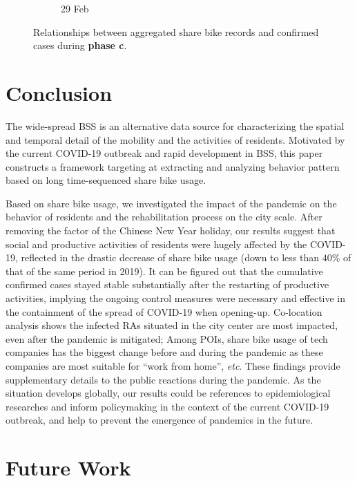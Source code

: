 \documentclass[ijgi,submit,moreauthors,pdftex]{Definitions/mdpi}
\begin{document}
\begin{figure}[!ht]
\begin{subfigure}{.3\textwidth}
\begin{tikzpicture}[inner sep = 0pt]
        \end{tikzpicture}
        \caption{29 Feb}
        \label{fig:correlation_02_29}
    \end{subfigure}
    \caption{Relationships between aggregated share bike records and confirmed cases during \textbf{phase c}.}
    \label{fig:BSS_phase_3}
\end{figure}


\section{Conclusion}\label{sec:conclusion}
The wide-spread BSS is an alternative data source for characterizing the spatial and temporal detail of the mobility and the activities of residents.
Motivated by the current COVID-19 outbreak and rapid development in BSS, this paper constructs a framework targeting at extracting and analyzing behavior pattern based on long time-sequenced share bike usage. 

Based on share bike usage, we investigated the impact of the pandemic on the behavior of residents and the rehabilitation process on the city scale.
After removing the factor of the Chinese New Year holiday, our results suggest that social and productive activities of residents were hugely affected by the COVID-19, reflected in the drastic decrease of share bike usage (down to less than $40\%$ of that of the same period in 2019). 
It can be figured out that the cumulative confirmed cases stayed stable substantially after the restarting of productive activities, implying the ongoing control measures were necessary and effective in the containment of the spread of COVID-19 when opening-up.
Co-location analysis shows the infected RAs situated in the city center are most impacted, even after the pandemic is mitigated;
Among POIs, share bike usage of tech companies has the biggest change before and during the pandemic as these companies are most suitable for ``work from home'', \textit{etc}.
These findings provide supplementary details to the public reactions during the pandemic.
As the situation develops globally, our results could be references to epidemiological researches and inform policymaking in the context of the current COVID-19 outbreak, and help to prevent the emergence of pandemics in the future.
\section{Future Work}\label{sec:future}
\end{document}
